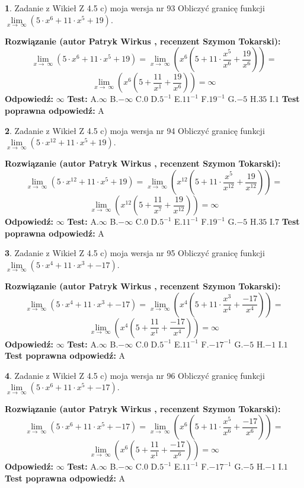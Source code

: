\documentclass[12pt, a4paper]{article}
\theoremstyle{definition} %
\newtheorem{zad}{}
\newcommand{\zadStart}[1]{\begin{zad}#1\newline}
\newcommand{\zadStop}{\end{zad}}
\newcommand{\rozwStart}[2]{\noindent \textbf{Rozwiązanie (autor #1 , recenzent #2): }\newline}
\newcommand{\rozwStop}{\newline}
\newcommand{\odpStart}{\noindent \textbf{Odpowiedź:}\newline}
\newcommand{\odpStop}{\newline}
\newcommand{\testStart}{\noindent \textbf{Test:}\newline}
\newcommand{\testStop}{\newline}
\newcommand{\kluczStart}{\noindent \textbf{Test poprawna odpowiedź:}\newline}
\newcommand{\kluczStop}{\newline}
\begin{document}
\zadStart{Zadanie z Wikieł Z 4.5 c) moja wersja nr 93}
Obliczyć granicę funkcji  $\lim\limits_{x\to\ \infty}(5 \cdot x^{6}+11 \cdot x^{5}+19)$.
\zadStop
\rozwStart{Patryk Wirkus}{Szymon Tokarski}
$$\lim\limits_{x\to\ \infty}(5 \cdot x^{6}+11 \cdot x^{5}+19) = \lim\limits_{x\to\ \infty}(x^{6}(5 +11 \cdot \frac{x^{5}}{x^{6}}+\frac{19}{x^{6}})) =$$ $$\lim\limits_{x\to\ \infty}(x^{6}(5 +\frac{11}{x^{1}}+\frac{19}{x^{6}})) =\infty$$
\rozwStop
\odpStart
$\infty$
\odpStop
\testStart
A.$\infty$ B.$-\infty$ C.$0$ D.$5^{-1}$ E.$11^{-1}$
F.$19^{-1}$ G.$-5$
H.$35$
I.$1$
\testStop
\kluczStart
A
\kluczStop



\zadStart{Zadanie z Wikieł Z 4.5 c) moja wersja nr 94}
Obliczyć granicę funkcji  $\lim\limits_{x\to\ \infty}(5 \cdot x^{12}+11 \cdot x^{5}+19)$.
\zadStop
\rozwStart{Patryk Wirkus}{Szymon Tokarski}
$$\lim\limits_{x\to\ \infty}(5 \cdot x^{12}+11 \cdot x^{5}+19) = \lim\limits_{x\to\ \infty}(x^{12}(5 +11 \cdot \frac{x^{5}}{x^{12}}+\frac{19}{x^{12}})) =$$ $$\lim\limits_{x\to\ \infty}(x^{12}(5 +\frac{11}{x^{7}}+\frac{19}{x^{12}})) =\infty$$
\rozwStop
\odpStart
$\infty$
\odpStop
\testStart
A.$\infty$ B.$-\infty$ C.$0$ D.$5^{-1}$ E.$11^{-1}$
F.$19^{-1}$ G.$-5$
H.$35$
I.$7$
\testStop
\kluczStart
A
\kluczStop



\zadStart{Zadanie z Wikieł Z 4.5 c) moja wersja nr 95}
Obliczyć granicę funkcji  $\lim\limits_{x\to\ \infty}(5 \cdot x^{4}+11 \cdot x^{3}+-17)$.
\zadStop
\rozwStart{Patryk Wirkus}{Szymon Tokarski}
$$\lim\limits_{x\to\ \infty}(5 \cdot x^{4}+11 \cdot x^{3}+-17) = \lim\limits_{x\to\ \infty}(x^{4}(5 +11 \cdot \frac{x^{3}}{x^{4}}+\frac{-17}{x^{4}})) =$$ $$\lim\limits_{x\to\ \infty}(x^{4}(5 +\frac{11}{x^{1}}+\frac{-17}{x^{4}})) =\infty$$
\rozwStop
\odpStart
$\infty$
\odpStop
\testStart
A.$\infty$ B.$-\infty$ C.$0$ D.$5^{-1}$ E.$11^{-1}$
F.$-17^{-1}$ G.$-5$
H.$-1$
I.$1$
\testStop
\kluczStart
A
\kluczStop



\zadStart{Zadanie z Wikieł Z 4.5 c) moja wersja nr 96}
Obliczyć granicę funkcji  $\lim\limits_{x\to\ \infty}(5 \cdot x^{6}+11 \cdot x^{5}+-17)$.
\zadStop
\rozwStart{Patryk Wirkus}{Szymon Tokarski}
$$\lim\limits_{x\to\ \infty}(5 \cdot x^{6}+11 \cdot x^{5}+-17) = \lim\limits_{x\to\ \infty}(x^{6}(5 +11 \cdot \frac{x^{5}}{x^{6}}+\frac{-17}{x^{6}})) =$$ $$\lim\limits_{x\to\ \infty}(x^{6}(5 +\frac{11}{x^{1}}+\frac{-17}{x^{6}})) =\infty$$
\rozwStop
\odpStart
$\infty$
\odpStop
\testStart
A.$\infty$ B.$-\infty$ C.$0$ D.$5^{-1}$ E.$11^{-1}$
F.$-17^{-1}$ G.$-5$
H.$-1$
I.$1$
\testStop
\kluczStart
A
\kluczStop
\end{document}
